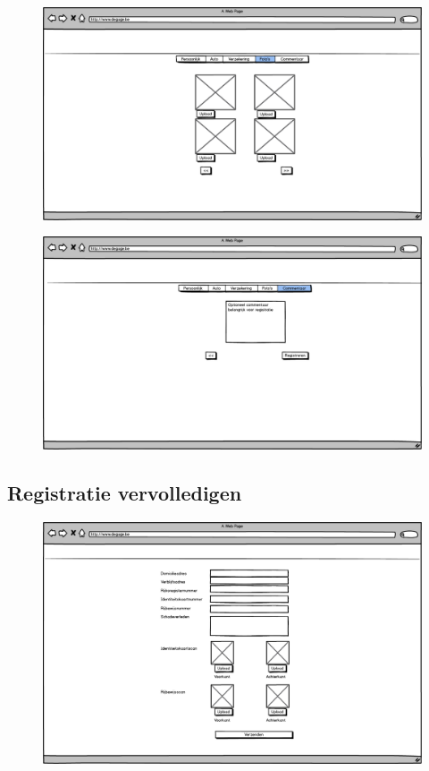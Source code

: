 \documentclass[11pt,a4paper,oneside]{article}
\begin{document}
\begin{figure}[H]\includegraphics[width=\textwidth]{../../mockups/registratie_eigenaar_fotos.png}\end{figure}
\begin{figure}[H]\includegraphics[width=\textwidth]{../../mockups/registratie_eigenaar_commentaar.png}\end{figure}

\subsection{Registratie vervolledigen}
\begin{figure}[H]\includegraphics[width=\textwidth]{../../mockups/registratievervolledigen.png}\end{figure}
\end{document}
